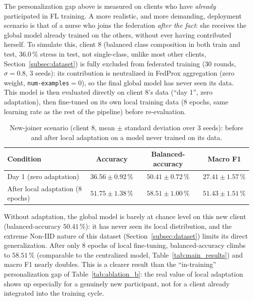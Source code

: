 \documentclass{article}
\begin{document}
The personalization gap above is measured on clients who have \emph{already}
participated in FL training. A more realistic, and more demanding, deployment
scenario is that of a nurse who joins the federation \emph{after the fact}: she
receives the global model already trained on the others, without ever having
contributed herself. To simulate this, client 8 (balanced class composition in
both train and test, $36.0\,\%$ stress in test, not single-class, unlike most
other clients, Section~\ref{subsec:dataset}) is fully excluded from federated
training (30 rounds, $\sigma=0.8$, 3 seeds): its contribution is neutralized in
FedProx aggregation (zero weight, \texttt{num-examples}$=0$), so the final global
model has never seen its data. This model is then evaluated directly on client
8's data (``day 1'', zero adaptation), then fine-tuned on its own local training
data (8 epochs, same learning rate as the rest of the pipeline) before
re-evaluation.

\begin{table}[h!]
  \centering
  \caption{New-joiner scenario (client 8, mean $\pm$ standard deviation over 3
  seeds): before and after local adaptation on a model never trained on its data.}
  \label{tab:late_joiner}
  \begin{tabular}{lccc}
    \toprule
    Condition & Accuracy & Balanced-accuracy & Macro F1 \\
    \midrule
    Day 1 (zero adaptation) & $36.56 \pm 0.92\,\%$ & $50.41 \pm 0.72\,\%$ & $27.41 \pm 1.57\,\%$ \\
    After local adaptation (8 epochs) & $51.75 \pm 1.38\,\%$ & $\mathbf{58.51 \pm 1.00\,\%}$ & $\mathbf{51.43 \pm 1.51\,\%}$ \\
    \bottomrule
  \end{tabular}
\end{table}

Without adaptation, the global model is barely at chance level on this new client
(balanced-accuracy $50.41\,\%$): it has never seen its local distribution, and the
extreme Non-IID nature of this dataset (Section~\ref{subsec:dataset}) limits its
direct generalization. After only 8 epochs of local fine-tuning, balanced-accuracy
climbs to $58.51\,\%$ (comparable to the centralized model,
Table~\ref{tab:main_results}) and macro F1 nearly doubles. This is a clearer
result than the ``in-training'' personalization gap of Table~\ref{tab:ablation_b}:
the real value of local adaptation shows up especially for a genuinely new
participant, not for a client already integrated into the training cycle.
\end{document}
